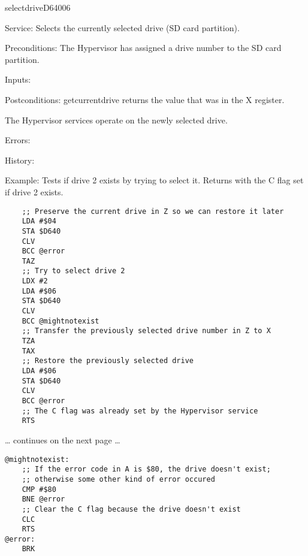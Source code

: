 \newpage
\begin{hyppotrap}{selectdrive}{D640}{06}
\item [Service:]
  Selects the currently selected drive (SD card partition).
\item [Preconditions:]
  The Hypervisor has assigned a drive number to the SD card partition.
\item [Inputs:]
\item [Postconditions:]
  getcurrentdrive returns the value that was in the X register.

  The Hypervisor services operate on the newly selected drive.
\item [Errors:]
\item [History:]
\item [Example:]
  Tests if drive 2 exists by trying to select it. Returns with the C flag set if
  drive 2 exists.

\begin{tcolorbox}[colback=black,coltext=white]
\verbatimfont{\codefont}
\begin{verbatim}
    ;; Preserve the current drive in Z so we can restore it later
    LDA #$04
    STA $D640
    CLV
    BCC @error
    TAZ
    ;; Try to select drive 2
    LDX #2
    LDA #$06
    STA $D640
    CLV
    BCC @mightnotexist
    ;; Transfer the previously selected drive number in Z to X
    TZA
    TAX
    ;; Restore the previously selected drive
    LDA #$06
    STA $D640
    CLV
    BCC @error
    ;; The C flag was already set by the Hypervisor service
    RTS
\end{verbatim}
\end{tcolorbox}

\ldots{} continues on the next page \ldots

\begin{tcolorbox}[colback=black,coltext=white]
\verbatimfont{\codefont}
\begin{verbatim}
@mightnotexist:
    ;; If the error code in A is $80, the drive doesn't exist;
    ;; otherwise some other kind of error occured
    CMP #$80
    BNE @error
    ;; Clear the C flag because the drive doesn't exist
    CLC
    RTS
@error:
    BRK
\end{verbatim}
\end{tcolorbox}
\end{hyppotrap}


